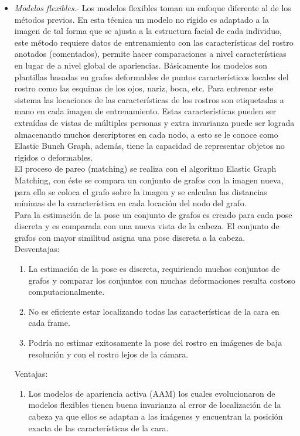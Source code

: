 \begin{itemize}
\item \textit{Modelos flexibles}.- Los modelos flexibles toman un enfoque diferente al de los métodos previos. En esta técnica un modelo no rígido es adaptado a la imagen de tal forma que se ajusta a la estructura facial de cada individuo, este método requiere datos de entrenamiento con las características del rostro anotados (comentados), permite hacer comparaciones a nivel características en lugar de a nivel global de apariencias. Básicamente los modelos son plantillas basadas en grafos deformables de puntos característicos locales del rostro como las esquinas de los ojos, nariz, boca, etc. Para entrenar este sistema las locaciones de las características de los rostros son etiquetadas a mano en cada imagen de entrenamiento. Estas características pueden ser extraídas de vistas de múltiples personas y extra invarianza puede ser lograda almacenando muchos descriptores en cada nodo, a esto se le conoce como Elastic Bunch Graph, además, tiene la capacidad de representar objetos no rigidos o deformables. \\
El proceso de pareo (matching) se realiza con el algoritmo Elastic Graph Matching, con éste se compara un conjunto de grafos con la imagen nueva, para ello se coloca el grafo sobre la imagen y se calculan las distancias mínimas de la característica en cada locación del nodo del grafo. \\
Para la estimación de la pose un conjunto de grafos es creado para cada pose discreta y es comparada con una nueva vista de la cabeza. El conjunto de grafos con mayor similitud asigna una pose discreta a la cabeza.
\\Desventajas:
\begin{enumerate}[label=(\alph*)]
	\item La estimación de la pose es discreta, requiriendo muchos conjuntos de grafos y comparar los conjuntos con muchas deformaciones resulta costoso computacionalmente.
	\item No es eficiente estar localizando todas las características de la cara en cada frame.
	\item Podría no estimar exitosamente la pose del rostro en imágenes de baja resolución y con el rostro lejos de la cámara.
\end{enumerate}

Ventajas:
\begin{enumerate}[label=(\alph*)]
	\item  Los modelos de apariencia activa (AAM) los cuales evolucionaron de modelos flexibles tienen buena invarianza al error de localización de la cabeza ya que ellos se adaptan a las imágenes y encuentran la posición exacta de las características de la cara.
\end{enumerate}


\end{itemize}
